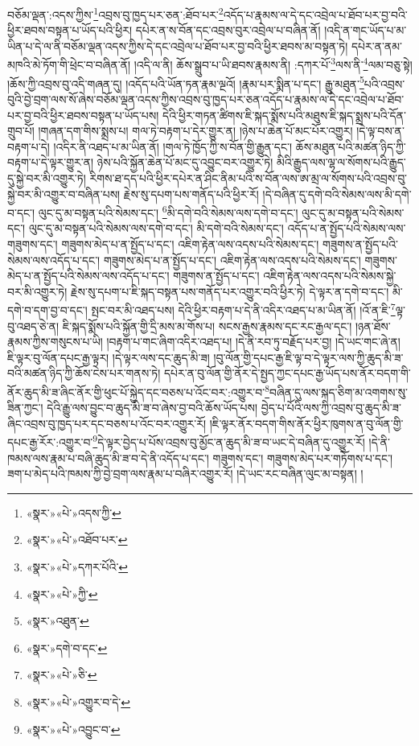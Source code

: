 བཅོམ་ལྡན་:འདས་ཀྱིས་\footnote{«སྣར་»«པེ་»འདས་ཀྱི་}འབྲས་བུ་ཁྱད་པར་ཅན་:ཐོབ་པར་\footnote{«སྣར་»«པེ་»འཐོབ་པར་}འདོད་པ་རྣམས་ལ་དེ་དང་འབྲེལ་པ་ཐོབ་པར་བྱ་བའི་ཕྱིར་ཐབས་བསྟན་པ་ཡོད་པའི་ཕྱིར། དཔེར་ན་ས་བོན་དང་འབྲས་བུར་འབྲེལ་པ་བཞིན་ནོ། །འདི་ན་གང་ཡོད་པ་མ་ཡིན་པ་དེ་ལ་ནི་བཅོམ་ལྡན་འདས་ཀྱིས་དེ་དང་འབྲེལ་པ་ཐོབ་པར་བྱ་བའི་ཕྱིར་ཐབས་མ་བསྟན་ཏེ། དཔེར་ན་ནམ་མཁའི་མེ་ཏོག་གི་ཕྲེང་བ་བཞིན་ནོ། །འདི་ལ་ནི། ཆོས་སྒྲུབ་པ་ཡི་ཐབས་རྣམས་ནི། :དཀར་པོ་\footnote{«སྣར་»«པེ་»དཀར་པོའི་}ལས་ནི་\footnote{«སྣར་»«པེ་»ཀྱི་}ལམ་བཅུ་སྟེ། །ཆོས་ཀྱི་འབྲས་བུ་འདི་གཞན་དུ། །འདོད་པའི་ཡོན་ཏན་རྣམ་ལྔའོ། །རྣམ་པར་སྨིན་པ་དང་། རྒྱུ་མཐུན་\footnote{«སྣར་»འཐུན་}པའི་འབྲས་བུའི་བྱེ་བྲག་ལས་སོ་ཞེས་བཅོམ་ལྡན་འདས་ཀྱིས་འབྲས་བུ་ཁྱད་པར་ཅན་འདོད་པ་རྣམས་ལ་དེ་དང་འབྲེལ་པ་ཐོབ་པར་བྱ་བའི་ཕྱིར་ཐབས་བསྟན་པ་ཡོད་པས། དེའི་ཕྱིར་གཏན་ཚིགས་ཇི་སྐད་སྨོས་པའི་མཐུས་ཇི་སྐད་སྨྲས་པའི་དོན་གྲུབ་པོ། །གཞན་དག་གིས་སྨྲས་པ། གལ་ཏེ་བརྟག་པ་དེར་གྱུར་ན། །ཉེས་པ་ཆེན་པོ་མང་པོར་འགྱུར། །དེ་ལྟ་བས་ན་བརྟག་པ་དེ། །འདིར་ནི་འཐད་པ་མ་ཡིན་ནོ། །གལ་ཏེ་ཁྱོད་ཀྱི་ས་བོན་གྱི་རྒྱུན་དང་། ཆོས་མཐུན་པའི་མཚན་ཉིད་ཀྱི་བརྟག་པ་དེ་ལྟར་གྱུར་ན། ཉེས་པའི་སྐྱོན་ཆེན་པོ་མང་དུ་འབྱུང་བར་འགྱུར་ཏེ། མིའི་རྒྱུད་ལས་ལྷ་ལ་སོགས་པའི་རྒྱུད་དུ་སྐྱེ་བར་མི་འགྱུར་ཏེ། རིགས་ཐ་དད་པའི་ཕྱིར་དཔེར་ན་ཤིང་ནིམ་པའི་ས་བོན་ལས་ཨ་མྲ་ལ་སོགས་པའི་འབྲས་བུ་སྐྱེ་བར་མི་འགྱུར་བ་བཞིན་པས། རྗེས་སུ་དཔག་པས་གནོད་པའི་ཕྱིར་རོ། །དེ་བཞིན་དུ་དགེ་བའི་སེམས་ལས་མི་དགེ་བ་དང་། ལུང་དུ་མ་བསྟན་པའི་སེམས་དང་། \footnote{«སྣར་»དགེ་བ་དང་}མི་དགེ་བའི་སེམས་ལས་དགེ་བ་དང་། ལུང་དུ་མ་བསྟན་པའི་སེམས་དང་། ལུང་དུ་མ་བསྟན་པའི་སེམས་ལས་དགེ་བ་དང་། མི་དགེ་བའི་སེམས་དང་། འདོད་པ་ན་སྤྱོད་པའི་སེམས་ལས་གཟུགས་དང་། གཟུགས་མེད་པ་ན་སྤྱོད་པ་དང་། འཇིག་རྟེན་ལས་འདས་པའི་སེམས་དང་། གཟུགས་ན་སྤྱོད་པའི་སེམས་ལས་འདོད་པ་དང་། གཟུགས་མེད་པ་ན་སྤྱོད་པ་དང་། འཇིག་རྟེན་ལས་འདས་པའི་སེམས་དང་། གཟུགས་མེད་པ་ན་སྤྱོད་པའི་སེམས་ལས་འདོད་པ་དང་། གཟུགས་ན་སྤྱོད་པ་དང་། འཇིག་རྟེན་ལས་འདས་པའི་སེམས་སྐྱེ་བར་མི་འགྱུར་ཏེ། རྗེས་སུ་དཔག་པ་ཇི་སྐད་བསྟན་པས་གནོད་པར་འགྱུར་བའི་ཕྱིར་ཏེ། དེ་ལྟར་ན་དགེ་བ་དང་། མི་དགེ་བ་དག་བྱ་བ་དང་། སྤང་བར་མི་འཐད་པས། དེའི་ཕྱིར་བརྟག་པ་དེ་ནི་འདིར་འཐད་པ་མ་ཡིན་ནོ། །འོ་ན་ཇི་\footnote{«སྣར་»«པེ་»ཅི་}ལྟ་བུ་འཐད་ཅེ་ན། ཇི་སྐད་སྨོས་པའི་སྐྱོན་གྱི་དྲི་མས་མ་གོས་པ། སངས་རྒྱས་རྣམས་དང་རང་རྒྱལ་དང་། །ཉན་ཐོས་རྣམས་ཀྱིས་གསུངས་པ་ཡི། །བརྟག་པ་གང་ཞིག་འདིར་འཐད་པ། །དེ་ནི་རབ་ཏུ་བརྗོད་པར་བྱ། །དེ་ཡང་གང་ཞེ་ན། ཇི་ལྟར་བུ་ལོན་དཔང་རྒྱ་ལྟར། །དེ་ལྟར་ལས་དང་ཆུད་མི་ཟ། །བུ་ལོན་གྱི་དཔང་རྒྱ་ཇི་ལྟ་བ་དེ་ལྟར་ལས་ཀྱི་ཆུད་མི་ཟ་བའི་མཚན་ཉིད་ཀྱི་ཆོས་ངེས་པར་གནས་ཏེ། དཔེར་ན་བུ་ལོན་གྱི་ནོར་དེ་སྤྱད་ཀྱང་དཔང་རྒྱ་ཡོད་པས་ནོར་བདག་གི་ནོར་ཆུད་མི་ཟ་ཞིང་ནོར་གྱི་ཕུང་པོ་སྐྱེད་དང་བཅས་པ་འོང་བར་:འགྱུར་བ་\footnote{«སྣར་»«པེ་»འགྱུར་བ་དེ་}བཞིན་དུ་ལས་སྐད་ཅིག་མ་འགགས་སུ་ཟིན་ཀྱང་། དེའི་རྒྱུ་ལས་བྱུང་བ་ཆུད་མི་ཟ་བ་ཞེས་བྱ་བའི་ཆོས་ཡོད་པས། བྱེད་པ་པོའི་ལས་ཀྱི་འབྲས་བུ་ཆུད་མི་ཟ་ཞིང་འབྲས་བུ་ཁྱད་པར་དང་བཅས་པ་འོང་བར་འགྱུར་རོ། །ཇི་ལྟར་ནོར་བདག་གིས་ནོར་ཕྱིར་ཁུགས་ན་བུ་ལོན་གྱི་དཔང་རྒྱ་རོར་:འགྱུར་བ་\footnote{«སྣར་»«པེ་»འབྱུང་བ་}དེ་ལྟར་བྱེད་པ་པོས་འབྲས་བུ་མྱོང་ན་ཆུད་མི་ཟ་བ་ཡང་དེ་བཞིན་དུ་འགྱུར་རོ། །དེ་ནི་ཁམས་ལས་རྣམ་པ་བཞི་ཆུད་མི་ཟ་བ་དེ་ནི་འདོད་པ་དང་། གཟུགས་དང་། གཟུགས་མེད་པར་གཏོགས་པ་དང་། ཟག་པ་མེད་པའི་ཁམས་ཀྱི་བྱེ་བྲག་ལས་རྣམ་པ་བཞིར་འགྱུར་རོ། །དེ་ཡང་རང་བཞིན་ལུང་མ་བསྟན། །
